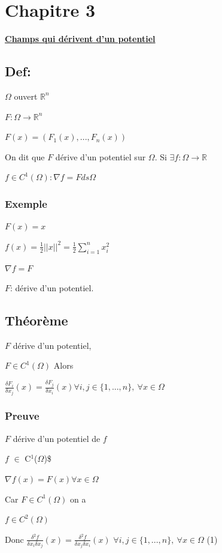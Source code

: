 \documentclass[11pt]{article}
\begin{document}
\section{Chapitre 3}
\label{sec:orgheadline41}
\uline{\textbf{Champs qui dérivent d'un potentiel}}
\subsection{Def:}
\label{sec:orgheadline29}
\(\Omega\) ouvert \(\mathbb{R}^n\)

\(F: \Omega \rightarrow \mathbb{R}^n\)

\(F(x) = (F_1(x),...,F_n(x))\)

On dit que \(F\) dérive d'un potentiel sur \(\Omega\). Si \(\exists f: \Omega \rightarrow \mathbb{R}\)

\(f\in C^1(\Omega): \nabla f = F ds \Omega\)
\subsubsection{Exemple}
\label{sec:orgheadline28}
\(F(x) = x\)

\(f(x) = \frac{1}{2} ||x||^2 = \frac{1}{2} \sum\limits_{i=1}^n x_i^2\)

\(\nabla f = F\)

\(F\): dérive d'un potentiel.
\subsection{Théorème}
\label{sec:orgheadline31}
\(F\) dérive d'un potentiel,

\(F \in C^1(\Omega)\) Alors

\(\frac{\delta F_i}{\delta x_j}(x) = \frac{\delta F_j}{\delta x_i}(x) \forall i,j \in \lbrace 1,...,n\rbrace,\ \forall x \in \Omega\)
\subsubsection{Preuve}
\label{sec:orgheadline30}
\(F\) dérive d'un potentiel de \(f\)

\(f\) \(\in\) C\(^{\text{1}}\)(\(\Omega\))\$

\(\nabla f(x)= F(x) \forall x \in \Omega\)

Car \(F\in C^1(\Omega)\) on a

\(f \in C^2(\Omega)\)

Donc \(\frac{\delta^2 f}{\delta x_i \delta x_j}(x) = \frac{\delta^2 f}{\delta x_j \delta x_i}(x)\) \(\forall i,j \in \lbrace 1,...,n\rbrace,\ \forall x \in \Omega\) (1)
\end{document}
